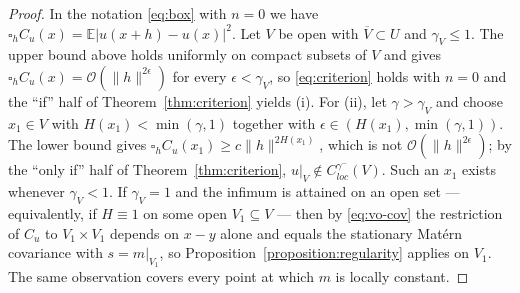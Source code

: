 \documentclass[pdflatex,sn-mathphys,Numbered]{sn-jnl}
\theoremstyle{thmstyleone}%
\theoremstyle{thmstyletwo}%
\theoremstyle{thmstylethree}%
\newcommand{\calO}{\mathcal{O}}
\newcommand{\E}{\mathbb{E}}
\begin{document}
\begin{proof}
In the notation \eqref{eq:box} with
$n=0$ we have $\square_h C_u(x) = \E|u(x+h)-u(x)|^2$. Let $V$ be open with
$\overline V\subset U$ and $\gamma_V\leq1$. The upper bound above holds
uniformly on compact subsets of $V$ and gives
$\square_h C_u(x) = \calO(\|h\|^{2\epsilon})$ for every $\epsilon<\gamma_V$,
so \eqref{eq:criterion} holds with $n=0$ and the ``if'' half of
Theorem~\ref{thm:criterion} yields (i). For (ii), let $\gamma>\gamma_V$ and
choose $x_1 \in V$ with $H(x_1)<\min(\gamma,1)$ together with
$\epsilon \in (H(x_1),\min(\gamma,1))$. The lower bound gives
$\square_h C_u(x_1) \geq c\|h\|^{2H(x_1)}$, which is not
$\calO(\|h\|^{2\epsilon})$; by the ``only if'' half of
Theorem~\ref{thm:criterion}, $u|_V \notin C^{\gamma^-}_{loc}(V)$. Such an $x_1$
exists whenever $\gamma_V<1$. If $\gamma_V=1$ and the infimum is attained on an
open set --- equivalently, if $H\equiv1$ on some open $V_1\subseteq V$ --- then
by \eqref{eq:vo-cov} the restriction of $C_u$ to $V_1\times V_1$ depends on
$x-y$ alone and equals the stationary Mat\'ern covariance with $s=m|_{V_1}$, so
Proposition~\ref{proposition:regularity} applies on $V_1$. The same
observation covers every point at which $m$ is locally constant.


\end{proof}
\end{document}
